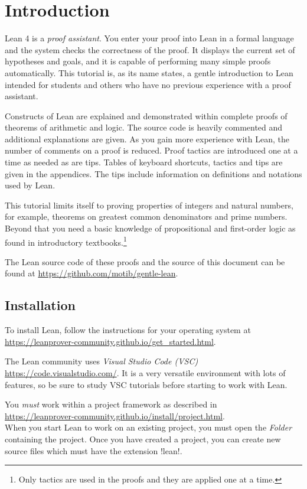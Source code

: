 
\section{Introduction}

Lean 4 is a \emph{proof assistant}. You enter your proof into Lean in a formal language and the system checks the correctness of the proof. It displays the current set of hypotheses and goals, and it is capable of performing many simple proofs automatically. This tutorial is, as its name states, a gentle introduction to Lean intended for students and others who have no previous experience with a proof assistant.

Constructs of Lean are explained and demonstrated within complete proofs of theorems of arithmetic and logic. The source code is heavily commented and additional explanations are given. As you gain more experience with Lean, the number of comments on a proof is reduced. Proof tactics are introduced one at a time as needed as are tips. Tables of keyboard shortcuts, tactics and tips are given in the appendices. The tips include information on definitions and notations used by Lean.

This tutorial limits itself to proving properties of integers and natural numbers, for example, theorems on greatest common denominators and prime numbers. Beyond that you need a basic knowledge of propositional and first-order logic as found in introductory textbooks.\footnote{Only tactics are used in the proofs and they are applied one at a time.}

The Lean source code of these proofs and the \XeLaTeX{} source of this document can be found at
\indnt{}\url{https://github.com/motib/gentle-lean}.

\subsection*{Installation}

To install Lean, follow the instructions for your operating system at\\
\indnt\url{https://leanprover-community.github.io/get_started.html}.

The Lean community uses \emph{Visual Studio Code (VSC)} \url{https://code.visualstudio.com/}. It is a very versatile environment with lots of features, so be sure to study VSC tutorials before starting to work with Lean.

You \emph{must} work within a project framework as described in\\ \indnt\url{https://leanprover-community.github.io/install/project.html}.\\ When you start Lean to work on an existing project, you must open the \emph{Folder} containing the project. Once you have created a project, you can create new source files which must have the extension !lean!.

